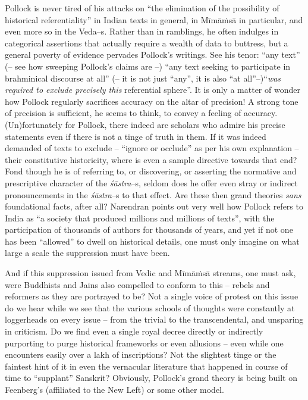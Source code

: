 {{Pollock is never tired of his attacks on “the elimination of the possibility of historical referentiality” in Indian texts in general, in Mīmāṁsā in particular, and even more so in the Veda–s. Rather than in ramblings, he often indulges in categorical assertions that actually require a wealth of data to buttress, but a general poverty of evidence pervades Pollock’s writings. See his tenor: “any text” (– see how sweeping Pollock’s claims are –) “any text seeking to participate in brahminical discourse at all” (– it is not just “any”, it is also “at all”–)\break “\textit{was required to exclude precisely this} referential sphere”. It is only a matter of wonder how Pollock regularly sacrifices accuracy on the altar of precision! A strong tone of precision is sufficient, he seems to think, to convey a feeling of accuracy. (Un)fortunately for Pollock, there indeed are scholars who admire his precise statements even if there is not a tinge of truth in them. If it was indeed demanded of texts to exclude – “ignore or occlude” as per his own explanation – their constitutive historicity, where is even a sample directive towards that end? Fond though he is of referring to, or discovering, or asserting the normative and prescriptive character of the \textit{śāstra}–s, seldom does he offer even stray or indirect pronouncements in the \textit{śāstra}–s to that effect. Are these then grand theories \textit{sans} foundational facts, after all? Narendran points out very well how Pollock refers to India as “a society that produced millions and millions of texts”, with the participation of thousands of authors for thousands of years, and yet if not one has been “allowed” to dwell on historical details, one must only imagine on what large a scale the suppression must have been.

And if this suppression issued from Vedic and Mīmāṁsā streams, one must ask, were Buddhists and Jains also compelled to conform to this – rebels and reformers as they are portrayed to be? Not a single voice of protest on this issue do we hear while we see that the various schools of thoughts were constantly at loggerheads on every issue – from the trivial to the transcendental, and unsparing in criticism. Do we find even a single royal decree directly or indirectly purporting to purge historical frameworks or even allusions – even while one encounters easily over a lakh of inscriptions? Not the slightest tinge or the faintest hint of it in even the vernacular literature that happened in course of time to “supplant” Sanskrit? Obviously, Pollock’s grand theory is being built on Feenberg’s (affiliated to the New Left) or some other model.

}}
